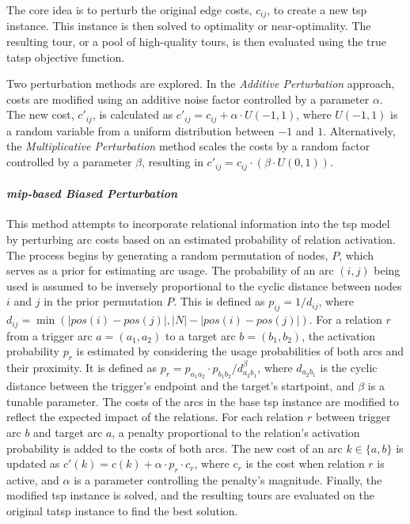 \documentclass[twocolumn]{article} %
\begin{document}
The core idea is to perturb the original edge costs, $c_{ij}$, to create a new \gls{tsp} instance.
This instance is then solved to optimality or near-optimality. The resulting tour, or a pool of high-quality tours, is then evaluated using the true \gls{tatsp} objective function.

Two perturbation methods are explored. In the \textit{Additive Perturbation} approach, costs are modified using an additive noise factor controlled by a parameter $\alpha$. The new cost, $c'_{ij}$, is calculated as $c'_{ij} = c_{ij} + \alpha \cdot U(-1, 1)$, where $U(-1, 1)$ is a random variable from a uniform distribution between $-1$ and $1$. Alternatively, the \textit{Multiplicative Perturbation} method scales the costs by a random factor controlled by a parameter $\beta$, resulting in $c'_{ij} = c_{ij} \cdot (\beta \cdot U(0, 1))$.

\paragraph{\textit{\gls{mip}-based Biased Perturbation}}
This method attempts to incorporate relational information into the \gls{tsp} model by perturbing arc costs based on an estimated probability of relation activation. The process begins by generating a random permutation of nodes, $P$, which serves as a prior for estimating arc usage. The probability of an arc $(i, j)$ being used is assumed to be inversely proportional to the cyclic distance between nodes $i$ and $j$ in the prior permutation $P$. This is defined as $p_{ij} = 1/d_{ij}$, where $d_{ij} = \min(|pos(i)-pos(j)|, |N| - |pos(i)-pos(j)|)$. For a relation $r$ from a trigger arc $a=(a_1, a_2)$ to a target arc $b=(b_1, b_2)$, the activation probability $p_r$ is estimated by considering the usage probabilities of both arcs and their proximity. It is defined as $p_r = p_{a_1a_2} \cdot p_{b_1b_2} / d_{a_2b_1}^\beta$, where $d_{a_2b_1}$ is the cyclic distance between the trigger's endpoint and the target's startpoint, and $\beta$ is a tunable parameter. The costs of the arcs in the base \gls{tsp} instance are modified to reflect the expected impact of the relations. For each relation $r$ between trigger arc $b$ and target arc $a$, a penalty proportional to the relation's activation probability is added to the costs of both arcs. The new cost of an arc $k \in \{a,b\}$ is updated as $c'(k) = c(k) + \alpha \cdot p_r \cdot c_r$, where $c_r$ is the cost when relation $r$ is active, and $\alpha$ is a parameter controlling the penalty's magnitude. Finally, the modified \gls{tsp} instance is solved, and the resulting tours are evaluated on the original \gls{tatsp} instance to find the best solution.
\end{document}

